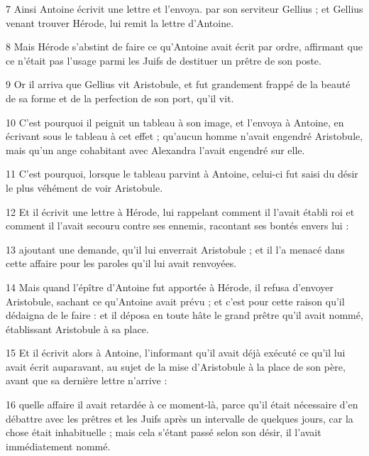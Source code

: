 \par 7 Ainsi Antoine écrivit une lettre et l'envoya. par son serviteur Gellius ; et Gellius venant trouver Hérode, lui remit la lettre d'Antoine.

\par 8 Mais Hérode s'abstint de faire ce qu'Antoine avait écrit par ordre, affirmant que ce n'était pas l'usage parmi les Juifs de destituer un prêtre de son poste.

\par 9 Or il arriva que Gellius vit Aristobule, et fut grandement frappé de la beauté de sa forme et de la perfection de son port, qu'il vit.

\par 10 C'est pourquoi il peignit un tableau à son image, et l'envoya à Antoine, en écrivant sous le tableau à cet effet ; qu'aucun homme n'avait engendré Aristobule, mais qu'un ange cohabitant avec Alexandra l'avait engendré sur elle.

\par 11 C'est pourquoi, lorsque le tableau parvint à Antoine, celui-ci fut saisi du désir le plus véhément de voir Aristobule.

\par 12 Et il écrivit une lettre à Hérode, lui rappelant comment il l'avait établi roi et comment il l'avait secouru contre ses ennemis, racontant ses bontés envers lui :

\par 13 ajoutant une demande, qu'il lui enverrait Aristobule ; et il l'a menacé dans cette affaire pour les paroles qu'il lui avait renvoyées.

\par 14 Mais quand l'épître d'Antoine fut apportée à Hérode, il refusa d'envoyer Aristobule, sachant ce qu'Antoine avait prévu ; et c'est pour cette raison qu'il dédaigna de le faire : et il déposa en toute hâte le grand prêtre qu'il avait nommé, établissant Aristobule à sa place.

\par 15 Et il écrivit alors à Antoine, l'informant qu'il avait déjà exécuté ce qu'il lui avait écrit auparavant, au sujet de la mise d'Aristobule à la place de son père, avant que sa dernière lettre n'arrive :

\par 16 quelle affaire il avait retardée à ce moment-là, parce qu'il était nécessaire d'en débattre avec les prêtres et les Juifs après un intervalle de quelques jours, car la chose était inhabituelle ; mais cela s'étant passé selon son désir, il l'avait immédiatement nommé.

